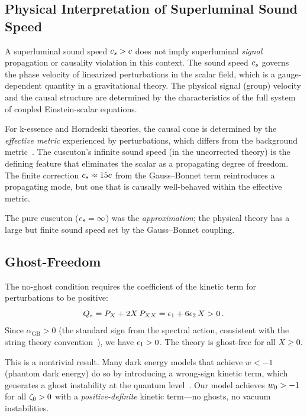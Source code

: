 \subsection{Physical Interpretation of Superluminal Sound Speed}
\label{sec:1-superluminal}

A superluminal sound speed $c_s > c$ does not imply superluminal \emph{signal} propagation or causality violation in this context. The sound speed $c_s$ governs the phase velocity of linearized perturbations in the scalar field, which is a gauge-dependent quantity in a gravitational theory. The physical signal (group) velocity and the causal structure are determined by the characteristics of the full system of coupled Einstein-scalar equations.

For k-essence and Horndeski theories, the causal cone is determined by the \emph{effective metric} experienced by perturbations, which differs from the background metric~\cite{ch1:babichev08,ch1:adams06,ch1:lovelock71,ch1:bruneton07}. The cuscuton's infinite sound speed (in the uncorrected theory) is the defining feature that eliminates the scalar as a propagating degree of freedom. The finite correction $c_s \approx 15c$ from the Gauss--Bonnet term reintroduces a propagating mode, but one that is causally well-behaved within the effective metric.

The pure cuscuton ($c_s = \infty$) was the \emph{approximation}; the physical theory has a large but finite sound speed set by the Gauss--Bonnet coupling.

\subsection{Ghost-Freedom}
\label{sec:1-ghost-freedom}

The no-ghost condition requires the coefficient of the kinetic term for perturbations to be positive:
\begin{equation}
\label{eq:1-no-ghost}
Q_s = P_X + 2X\,P_{XX} = \epsilon_1 + 6\epsilon_2\, X > 0\,.
\end{equation}
Since $\alpha_{\mathrm{GB}} > 0$ (the standard sign from the spectral action, consistent with the string theory convention~\cite{ch1:lovelock71,ch1:boulware-deser}), we have $\epsilon_1 > 0$. The theory is ghost-free for all $X \geq 0$.

This is a nontrivial result. Many dark energy models that achieve $w < -1$ (phantom dark energy) do so by introducing a wrong-sign kinetic term, which generates a ghost instability at the quantum level~\cite{ch1:carroll-phantom}. Our model achieves $w_0 > -1$ for all $\zeta_0 > 0$ with a \emph{positive-definite} kinetic term---no ghosts, no vacuum instabilities.

